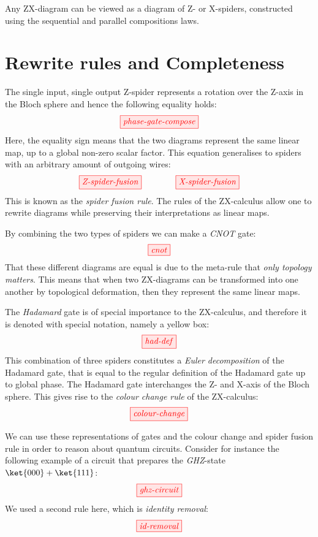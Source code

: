 \documentclass[a4paper, 12pt]{article}
\begin{document}
Any ZX-diagram can be viewed as a diagram of Z- or X-spiders, constructed using the
sequential and parallel compositions laws.



\section{Rewrite rules and Completeness}

The single input, single output Z-spider represents a rotation over the Z-axis in the Bloch sphere and hence the following equality holds:
\begin{equation*}
    \tikzfig{phase-gate-compose}
\end{equation*}
Here, the equality sign means that the two diagrams represent the same linear map, up to a global non-zero scalar factor. This equation generalises to spiders with an arbitrary amount of outgoing wires:
\begin{equation*}
    \tikzfig{Z-spider-fusion} \qquad\qquad \tikzfig{X-spider-fusion}
\end{equation*}
This is known as the \emph{spider fusion rule}. The rules of the ZX-calculus allow one to rewrite diagrams while preserving their interpretations as linear maps.

By combining the two types of spiders we can make a \emph{CNOT} gate:
\begin{equation*}
    \tikzfig{cnot}
\end{equation*}
That these different diagrams are equal is due to the meta-rule that \emph{only topology matters}. This means that when two ZX-diagrams can be transformed into one another by topological deformation, then they represent the same linear maps.

The \emph{Hadamard} gate is of special importance to the ZX-calculus, and therefore it is denoted with special notation, namely a yellow box:
\begin{equation*}
    \tikzfig{had-def}
\end{equation*}
This combination of three spiders constitutes a \emph{Euler decomposition} of the Hadamard gate, that is equal to the regular definition of the Hadamard gate up to global phase. The Hadamard gate interchanges the Z- and X-axis of the Bloch sphere. This gives rise to the \emph{colour change rule} of the ZX-calculus:
\begin{equation*}
    \tikzfig{colour-change}
\end{equation*}

We can use these representations of gates and the colour change and spider fusion rule in order to reason about quantum circuits. Consider for instance the following example of a circuit that prepares the \emph{GHZ}-state $\ket{000}+\ket{111}$:
\begin{equation*}
    \tikzfig{ghz-circuit}
\end{equation*}
We used a second rule here, which is \emph{identity removal}:
\begin{equation*}
    \tikzfig{id-removal}
\end{equation*}
\end{document}
